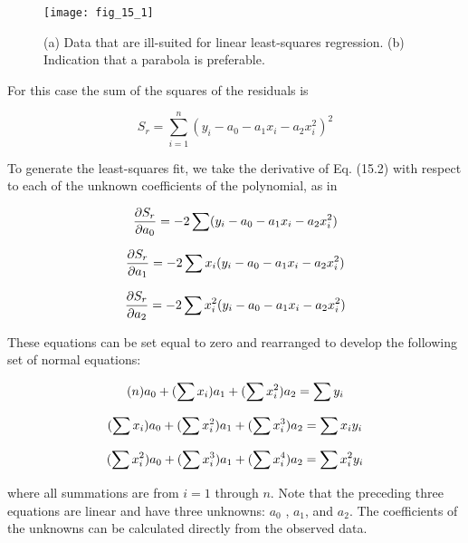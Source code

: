 \documentclass[../main.tex]{subfiles}
\begin{document}
\begin{figure}
    \centering
    \texttt{[image: fig\_15\_1]}
   \caption{\textsf{(a) Data that are ill-suited for linear least-squares regression. (b) Indication that a parabola is preferable.}}
   \label{fig:fig_15_1}
\end{figure}

\noindent For this case the sum of the squares of the residuals is

\begin{equation}
	\tag{15.2}
	S_r = \sum^n_{i=1}(y_i - a_0 - a_1x_i - a_2x^2_i)^2
\end{equation}

To generate the least-squares fit, we take the derivative of Eq. (15.2) with respect to each of the unknown coefficients of the polynomial, as in

\begin{equation}
	\notag
	\frac{\partial S_r}{\partial a_0} = -2 \sum (y_i -a_0 -a_1x_i - a_2x_i^2)
\end{equation}

\begin{equation}
	\notag
	\frac{\partial S_r}{\partial a_1} = -2 \sum x_i (y_i -a_0 -a_1x_i - a_2x_i^2)
\end{equation}

\begin{equation}
	\notag
	\frac{\partial S_r}{\partial a_2} = -2 \sum x_i^2 (y_i -a_0 -a_1x_i - a_2x_i^2)
\end{equation}

\noindent These equations can be set equal to zero and rearranged to develop the following set of normal equations:

\begin{equation}
	\notag
	(n)a_0 + (\sum x_i) a_1 + (\sum x^2_i) a_2 = \sum y_i
\end{equation}

\begin{equation}
	\notag
	(\sum x_i)a_0 + (\sum x_i ^ 2) a_1 + (\sum x^3_i) a_2 = \sum x_i y_i
\end{equation}

\begin{equation}
	\notag
	(\sum x_i^2)a_0 + (\sum x_i ^ 3) a_1 + (\sum x^4_i) a_2 = \sum x_i^2 y_i
\end{equation}

\noindent where all summations are from $i = 1$ through $n$. Note that the preceding three equations are linear and have three unknowns: $a_0$ , $a_1$, and $a_2$. The coefficients of the unknowns can be calculated directly from the observed data.
\end{document}
